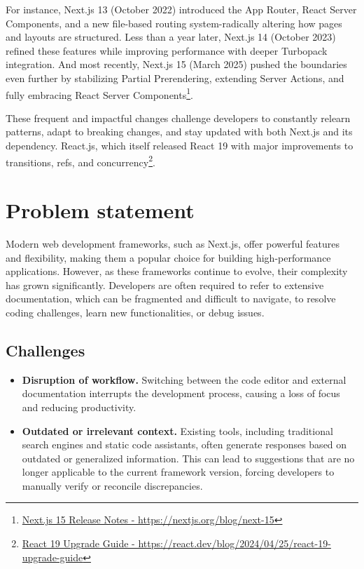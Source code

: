 For instance, Next.js 13 (October 2022) introduced the App Router, React Server Components, and a new file-based routing system-radically altering how pages and layouts are structured. Less than a year later, Next.js 14 (October 2023) refined these features while improving performance with deeper Turbopack integration. And most recently, Next.js 15 (March 2025) pushed the boundaries even further by stabilizing Partial Prerendering, extending Server Actions, and fully embracing React Server Components\footnote{\href{https://nextjs.org/blog/next-15}{Next.js 15 Release Notes - https://nextjs.org/blog/next-15}}.

These frequent and impactful changes challenge developers to constantly relearn patterns, adapt to breaking changes, and stay updated with both Next.js and its dependency. React.js, which itself released React 19 with major improvements to transitions, refs, and concurrency\footnote{\href{https://react.dev/blog/2024/04/25/react-19-upgrade-guide}{React 19 Upgrade Guide - https://react.dev/blog/2024/04/25/react-19-upgrade-guide}}.

\section{Problem statement} \label{problem_statement}

Modern web development frameworks, such as Next.js, offer powerful features and flexibility, making them a popular choice for building high-performance applications. However, as these frameworks continue to evolve, their complexity has grown significantly. Developers are often required to refer to extensive documentation, which can be fragmented and difficult to navigate, to resolve coding challenges, learn new functionalities, or debug issues.

\subsection*{Challenges}

\begin{itemize}
	\item \textbf{Disruption of workflow.} Switching between the code editor and external documentation interrupts the development process, causing a loss of focus and reducing productivity.
	\item \textbf{Outdated or irrelevant context.} Existing tools, including traditional search engines and static code assistants, often generate responses based on outdated or generalized information. This can lead to suggestions that are no longer applicable to the current framework version, forcing developers to manually verify or reconcile discrepancies.
\end{itemize}

